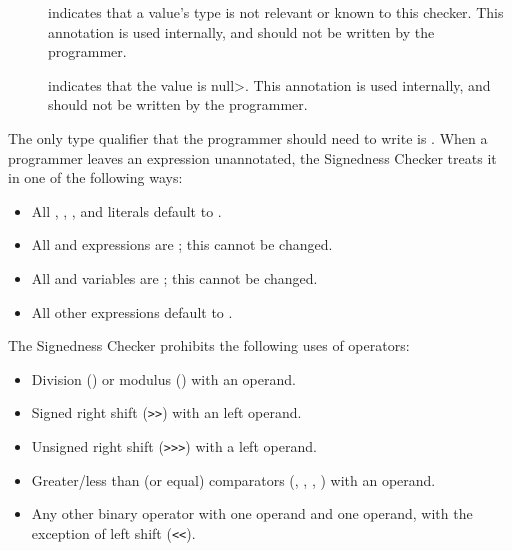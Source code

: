 \begin{description}
\item[]
    indicates that a value's type is not relevant or known to this checker.
    This annotation is used internally, and should not be
    written by the programmer.

\item[]
  indicates that the value is \<null>.
    This annotation is used internally, and should not
    be written by the programmer.

\end{description}



The only type qualifier that the programmer should need to write is
.
When a programmer leaves an expression unannotated, the
Signedness Checker treats it in one of the following ways:

\begin{itemize}

    \item
    All , , , and  literals default
    to .
    \item
    All  and  expressions are
    ; this cannot be changed.
    \item
    All  and  variables are
    ; this cannot be changed.
    \item
    All other expressions default to .

\end{itemize}


The Signedness Checker prohibits the following uses of operators:

\begin{itemize}

    \item
    Division (\code{/}) or modulus (\code{\%}) with an 
    operand.
    \item
    Signed right shift (\verb|>>|) with an  left operand.
    \item
    Unsigned right shift (\verb|>>>|) with a  left operand.
    \item
    Greater/less than (or equal) comparators
    (\code{<}, \code{<=}, \code{>}, \code{>=}) with an 
    operand.
    \item
    Any other binary operator with one  operand and one
     operand, with the exception of left shift (\verb|<<|).

\end{itemize}

